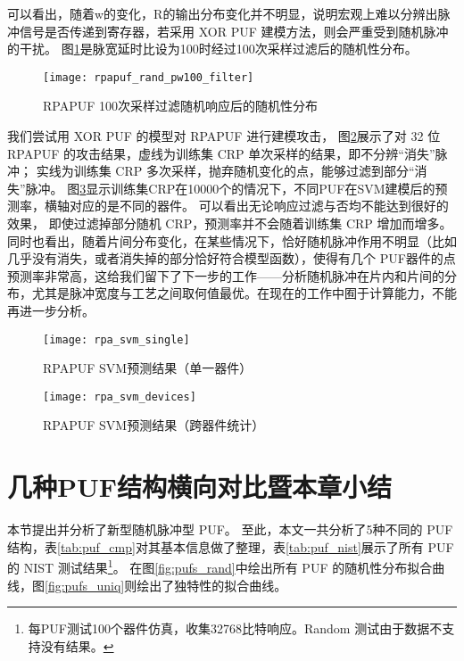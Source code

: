 可以看出，随着w的变化，R的输出分布变化并不明显，说明宏观上难以分辨出脉冲信号是否传递到寄存器，若采用 XOR PUF 建模方法，则会严重受到随机脉冲的干扰。
图\ref{fig:rpa-k100-rand}是脉宽延时比设为100时经过100次采样过滤后的随机性分布。

\begin{figure}[htb!]
\centering
\texttt{[image: rpapuf\_rand\_pw100\_filter]}
\caption{RPAPUF 100次采样过滤随机响应后的随机性分布}
\label{fig:rpa-k100-rand}
\end{figure}

我们尝试用 XOR PUF 的模型对 RPAPUF 进行建模攻击， 图\ref{fig:rpa-svm}展示了对 32 位 RPAPUF 的攻击结果，虚线为训练集 CRP 单次采样的结果，即不分辨``消失''脉冲；
实线为训练集 CRP 多次采样，抛弃随机变化的点，能够过滤到部分``消失''脉冲。
图\ref{fig:rpa-svm-devices}显示训练集CRP在10000个的情况下，不同PUF在SVM建模后的预测率，横轴对应的是不同的器件。
可以看出无论响应过滤与否均不能达到很好的效果， 即使过滤掉部分随机 CRP，预测率并不会随着训练集 CRP 增加而增多。
同时也看出，随着片间分布变化，在某些情况下，恰好随机脉冲作用不明显（比如几乎没有消失，或者消失掉的部分恰好符合模型函数），使得有几个 PUF器件的点预测率非常高，这给我们留下了下一步的工作——分析随机脉冲在片内和片间的分布，尤其是脉冲宽度与工艺之间取何值最优。在现在的工作中囿于计算能力，不能再进一步分析。

\begin{figure}[htb!]
\centering
\texttt{[image: rpa\_svm\_single]}
\caption{RPAPUF SVM预测结果（单一器件）}
\label{fig:rpa-svm}
\end{figure}

\begin{figure}[htb!]
\centering
\texttt{[image: rpa\_svm\_devices]}
\caption{RPAPUF SVM预测结果（跨器件统计）}
\label{fig:rpa-svm-devices}
\end{figure}

\section{几种PUF结构横向对比暨本章小结}\label{sec:rpa_summary}
本节提出并分析了新型随机脉冲型 PUF。
至此，本文一共分析了5种不同的 PUF 结构，表\ref{tab:puf_cmp}对其基本信息做了整理，表\ref{tab:puf_nist}展示了所有 PUF 的 NIST 测试结果\footnote{每PUF测试100个器件仿真，收集32768比特响应。Random 测试由于数据不支持没有结果。}。
在图\ref{fig:pufs_rand}中绘出所有 PUF 的随机性分布拟合曲线，图\ref{fig:pufs_uniq}则绘出了独特性的拟合曲线。

